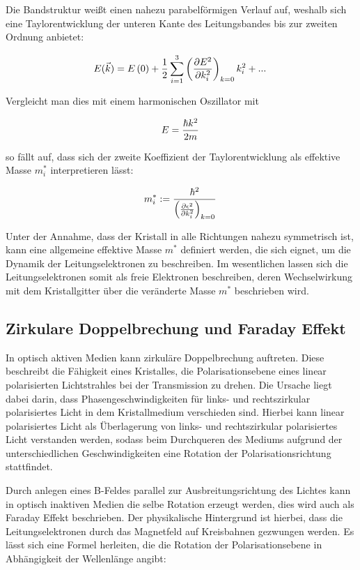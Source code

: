 Die Bandstruktur weißt einen nahezu parabelförmigen Verlauf auf, weshalb sich eine Taylorentwicklung der unteren Kante des
Leitungsbandes bis zur zweiten Ordnung anbietet:

\begin{equation}
    E(\vec{k})=E\left(0\right)+\frac{1}{2}\sum_{i=1}^3\left(\frac{\partial E^2}{\partial k_i^2}\right)_{k=0}k_i^2+...\,
    \notag
\end{equation}
 
Vergleicht man dies mit einem harmonischen Oszillator mit

\begin{equation}
    E=\frac{\hbar k^2}{2m}\,
    \notag
\end{equation}

so fällt auf, dass sich der zweite Koeffizient der Taylorentwicklung als effektive Masse $m_i^*$ interpretieren lässt:
    
\begin{equation}
    m_i^*:=\frac{\hbar^2}{\left(\frac{\partial\epsilon^2}{\partial k_i^2}\right)_{k=0}}\,
    \notag
\end{equation}

Unter der Annahme, dass der Kristall in alle Richtungen nahezu symmetrisch ist, kann eine allgemeine effektive Masse
$m^*$ definiert werden, die sich eignet, um die Dynamik der Leitungselektronen zu beschreiben. Im wesentlichen
lassen sich die Leitungselektronen somit als freie Elektronen beschreiben, deren Wechselwirkung mit dem Kristallgitter
über die veränderte Masse $m^*$ beschrieben wird.

\subsection{Zirkulare Doppelbrechung und Faraday Effekt}

In optisch aktiven Medien kann zirkuläre Doppelbrechung auftreten. Diese beschreibt die
Fähigkeit eines Kristalles, die Polarisationsebene eines linear polarisierten Lichtstrahles bei der Transmission zu drehen.
Die Ursache liegt dabei darin, dass Phasengeschwindigkeiten für links- und rechtszirkular polarisiertes Licht in dem Kristallmedium verschieden sind.
Hierbei kann linear polarisiertes Licht als Überlagerung von links- und rechtszirkular polarisiertes Licht verstanden werden, sodass
beim Durchqueren des Mediums aufgrund der unterschiedlichen Geschwindigkeiten eine Rotation der Polarisationsrichtung stattfindet. \cite{V46Anhang}

Durch anlegen eines B-Feldes parallel zur Ausbreitungsrichtung des Lichtes kann in optisch inaktiven Medien die selbe Rotation erzeugt werden, dies
wird auch als Faraday Effekt beschrieben. Der physikalische Hintergrund ist hierbei, dass die Leitungselektronen durch das Magnetfeld auf Kreisbahnen
gezwungen werden. Es lässt sich eine Formel herleiten, die die Rotation der Polarisationsebene in Abhängigkeit der Wellenlänge angibt:

